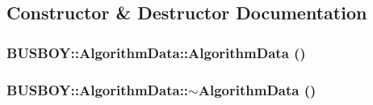 \subsection{Constructor \& Destructor Documentation}
\hypertarget{classBUSBOY_1_1AlgorithmData_a8f34fd577e01b28d2b3f5b8ede2d6b75}{
\subsubsection[{AlgorithmData}]{\setlength{\rightskip}{0pt plus 5cm}BUSBOY::AlgorithmData::AlgorithmData ()}}
\label{classBUSBOY_1_1AlgorithmData_a8f34fd577e01b28d2b3f5b8ede2d6b75}
\hypertarget{classBUSBOY_1_1AlgorithmData_ab00dea885e7bd25b979fc023c29ddbc2}{
\subsubsection[{$\sim$AlgorithmData}]{\setlength{\rightskip}{0pt plus 5cm}BUSBOY::AlgorithmData::$\sim$AlgorithmData ()}}
\label{classBUSBOY_1_1AlgorithmData_ab00dea885e7bd25b979fc023c29ddbc2}


